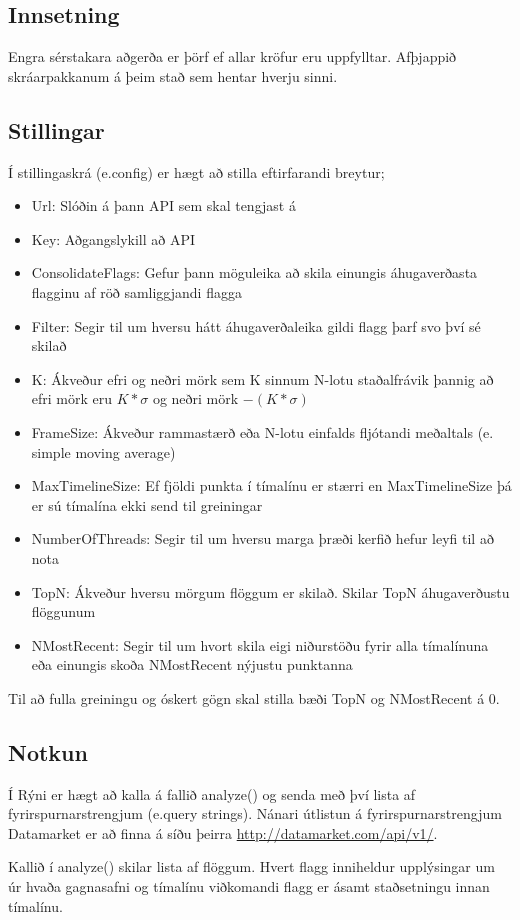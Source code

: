\documentclass[11pt]{article}
\begin{document}
\subsection{Innsetning}
Engra sérstakara aðgerða er þörf ef allar kröfur eru uppfylltar. Afþjappið skráarpakkanum á þeim stað sem hentar hverju sinni.
\subsection{Stillingar}
Í stillingaskrá (e.config) er hægt að stilla eftirfarandi breytur;\\

\begin{itemize}
  \item Url: Slóðin á þann API sem skal tengjast á
  \item Key: Aðgangslykill að API

  \item ConsolidateFlags: Gefur þann möguleika að skila einungis áhugaverðasta flagginu af röð samliggjandi flagga
  \item Filter: Segir til um hversu hátt áhugaverðaleika gildi flagg þarf svo því sé skilað

  \item K: Ákveður efri og neðri mörk sem K sinnum N-lotu staðalfrávik þannig að efri mörk eru $ K*\sigma$ og neðri mörk $-(K*\sigma)$
  \item FrameSize: Ákveður rammastærð eða N-lotu einfalds fljótandi meðaltals (e. simple moving average)
  \item MaxTimelineSize: Ef fjöldi punkta í tímalínu er stærri en MaxTimelineSize þá er sú tímalína ekki send til greiningar
  \item NumberOfThreads: Segir til um hversu marga þræði kerfið hefur leyfi til að nota

  \item TopN: Ákveður hversu mörgum flöggum er skilað. Skilar TopN áhugaverðustu flöggunum
  \item NMostRecent: Segir til um hvort skila eigi niðurstöðu fyrir alla tímalínuna eða einungis skoða NMostRecent nýjustu punktanna
\end{itemize}

Til að fulla greiningu og óskert gögn skal stilla bæði TopN og NMostRecent á 0.

\subsection{Notkun}
Í Rýni er hægt að kalla á fallið analyze() og senda með því lista af fyrirspurnarstrengjum (e.query strings).
Nánari útlistun á fyrirspurnarstrengjum Datamarket er að finna á síðu þeirra \url{http://datamarket.com/api/v1/}.

Kallið í analyze() skilar lista af flöggum. Hvert flagg inniheldur upplýsingar um úr hvaða gagnasafni og 
tímalínu viðkomandi flagg er ásamt staðsetningu innan tímalínu.
\end{document}
